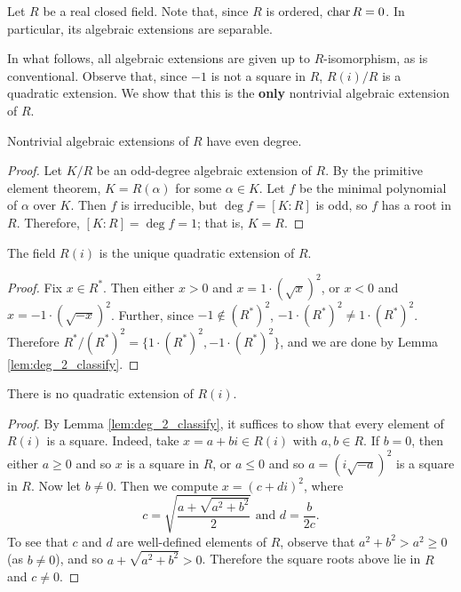 Let $R$ be a real closed field. Note that, since $R$ is ordered, $\operatorname{char} R=0$. In particular, its algebraic extensions are separable.

In what follows, all algebraic extensions are given up to $R$-isomorphism, as is conventional. Observe that, since $-1$ is not a square in $R$, $R(i)/R$ is a quadratic extension. We show that this is the \textbf{only} nontrivial algebraic extension of $R$.

\begin{lemma}
  \label{lem:alg_ext_odd_deg}
  Nontrivial algebraic extensions of $R$ have even degree.
\end{lemma}
\begin{proof}
  Let $K/R$ be an odd-degree algebraic extension of $R$. By the primitive element theorem, $K=R(\alpha)$ for some $\alpha\in K$. Let $f$ be the minimal polynomial of $\alpha$ over $K$. Then $f$ is irreducible, but $\deg f=[K:R]$ is odd, so $f$ has a root in $R$. Therefore, $[K:R]=\deg f=1$; that is, $K=R$.
\end{proof}

\begin{lemma}
  \label{lem:ext_deg_2}
  The field $R(i)$ is the unique quadratic extension of $R$.
\end{lemma}
\begin{proof}
  Fix $x\in R^*$. Then either $x>0$ and $x=1\cdot(\sqrt{x})^2$, or $x<0$ and $x=-1\cdot(\sqrt{-x})^2$. Further, since $-1\notin(R^*)^2$, $-1\cdot(R^*)^2\neq 1\cdot(R^*)^2$. Therefore $R^*/{(R^*)^2}=\{1\cdot(R^*)^2,-1\cdot(R^*)^2\}$, and we are done by Lemma \ref{lem:deg_2_classify}.
\end{proof}

\begin{lemma}
  \label{lem:Ri_ext_deg_2}
  There is no quadratic extension of $R(i)$.
\end{lemma}
\begin{proof}
  By Lemma \ref{lem:deg_2_classify}, it suffices to show that every element of $R(i)$ is a square. Indeed, take $x=a+bi\in R(i)$ with $a,b\in R$. If $b=0$, then either $a\geq0$ and so $x$ is a square in $R$, or $a\leq0$ and so $a=(i\sqrt{-a})^2$ is a square in $R$. Now let $b\neq0$. Then we compute $x=(c+di)^2$, where
  \[c=\sqrt{\frac{a+\sqrt{a^2+b^2}}{2}}\text{ and }d=\frac{b}{2c}.\]
  To see that $c$ and $d$ are well-defined elements of $R$, observe that $a^2+b^2>a^2\geq0$ (as $b\neq0$), and so $a+\sqrt{a^2+b^2}>0$. Therefore the square roots above lie in $R$ and $c\neq0$.
\end{proof}

